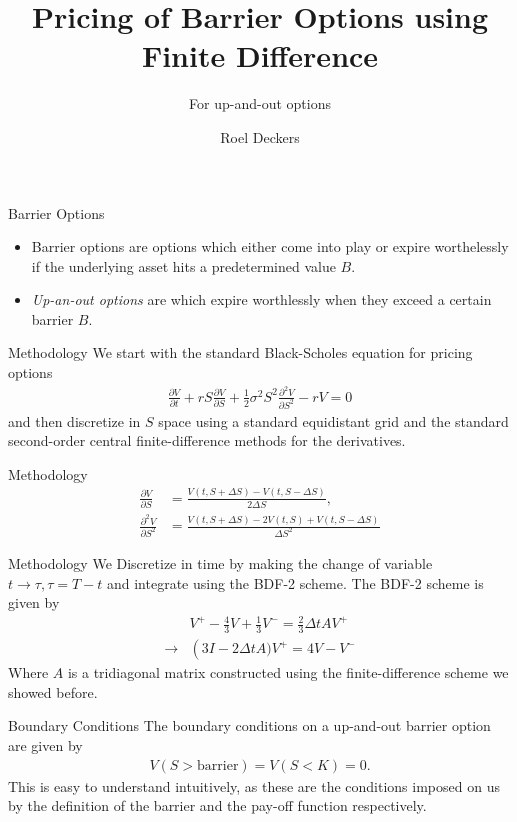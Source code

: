 \documentclass{beamer}
\title{Pricing of Barrier Options using Finite Difference}
\subtitle{For up-and-out options}
\author{Roel Deckers}
\numberwithin{equation}{section}
\newcommand{\nn}{\\\nonumber}
\newcommand{\pdrv}[2][x]{\frac{\partial #2}{\partial #1}}
\begin{document}
  \begin{frame}
    \frame{\titlepage}
  \end{frame}
\begin{frame}{Barrier Options}
\begin{itemize}
\item{Barrier options are options which either come into play or expire worthelessly
if the underlying asset hits a predetermined value $B$.}
\item{{\em Up-an-out options} are which expire worthlessly when they exceed a certain barrier $B$.}
\end{itemize}
\end{frame}
\begin{frame}{Methodology}
  We start with the standard Black-Scholes equation for pricing options
  \begin{align}
    \label{eq:pde}
    \pdrv[t]V + rS\pdrv[S]V + \frac{1}{2}\sigma^2S^2\pdrv[S^2]{^2V}-rV = 0
  \end{align}
  and then discretize in $S$ space using a standard equidistant grid and the standard second-order central finite-difference methods for the derivatives.
\end{frame}

\begin{frame}{Methodology}
  \begin{align}
    \pdrv[S]V &= \frac{V(t, S+\Delta S)-V(t, S-\Delta S)}{2\Delta S},\nn
    \pdrv[S^2]{^2V} &= \frac{V(t,S+\Delta S)-2V(t,S)+V(t,S-\Delta S)}{\Delta S^2}
  \end{align}
\end{frame}

\begin{frame}{Methodology}
  We Discretize in time by making the change of variable $t\to \tau, \tau = T-t$ and integrate using the BDF-2 scheme.
  The BDF-2 scheme is given by
  \begin{align}
   &V^+ - \frac{4}{3}V + \frac{1}{3}V^- = \frac{2}{3}\Delta t A V^+\nn
   \to& \left(3I-2\Delta t A)V^+ = 4V-V^-
  \end{align}
  Where $A$ is a tridiagonal matrix constructed using the finite-difference scheme we showed before.
\end{frame}

\begin{frame}{Boundary Conditions}
  The boundary conditions on a up-and-out barrier option are given by
  \begin{align}
    V(S > \text{barrier}) = V(S < K) = 0.
  \end{align}
  This is easy to understand intuitively, as these are the conditions imposed on us by the definition of the barrier and the pay-off function respectively.
\end{frame}
\end{document}
